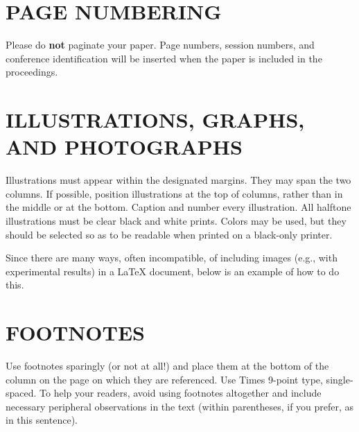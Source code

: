 \documentclass{article}
\begin{document}
\section{PAGE NUMBERING}
\label{sec:page}

Please do {\bf not} paginate your paper.  Page numbers, session numbers, and
conference identification will be inserted when the paper is included in the
proceedings.

\section{ILLUSTRATIONS, GRAPHS, AND PHOTOGRAPHS}
\label{sec:illust}

Illustrations must appear within the designated margins.  They may span the two
columns.  If possible, position illustrations at the top of columns, rather
than in the middle or at the bottom.  Caption and number every illustration.
All halftone illustrations must be clear black and white prints.  Colors may be
used, but they should be selected so as to be readable when printed on a
black-only printer.

Since there are many ways, often incompatible, of including images (e.g., with
experimental results) in a LaTeX document, below is an example of how to do
this.

\section{FOOTNOTES}
\label{sec:foot}

Use footnotes sparingly (or not at all!) and place them at the bottom of the
column on the page on which they are referenced. Use Times 9-point type,
single-spaced. To help your readers, avoid using footnotes altogether and
include necessary peripheral observations in the text (within parentheses, if
you prefer, as in this sentence).





\end{document}
